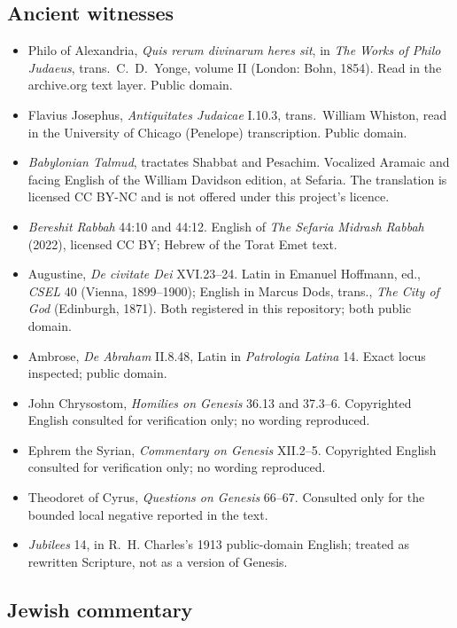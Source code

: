 \subsection{Ancient witnesses}

\begin{itemize}[leftmargin=1.2em,itemsep=0.2em,topsep=0.3em]
\item Philo of Alexandria, \textit{Quis rerum divinarum heres sit}, in
\textit{The Works of Philo Judaeus}, trans.\ C.~D.~Yonge, volume II (London:
Bohn, 1854). Read in the archive.org text layer. Public domain.
\item Flavius Josephus, \textit{Antiquitates Judaicae} I.10.3, trans.\ William
Whiston, read in the University of Chicago (Penelope) transcription. Public
domain.
\item \textit{Babylonian Talmud}, tractates Shabbat and Pesachim. Vocalized
Aramaic and facing English of the William Davidson edition, at Sefaria. The
translation is licensed CC BY-NC and is not offered under this project's licence.
\item \textit{Bereshit Rabbah} 44:10 and 44:12. English of \textit{The Sefaria
Midrash Rabbah} (2022), licensed CC BY; Hebrew of the Torat Emet text.
\item Augustine, \textit{De civitate Dei} XVI.23--24. Latin in Emanuel Hoffmann,
ed., \textit{CSEL} 40 (Vienna, 1899--1900); English in Marcus Dods, trans.,
\textit{The City of God} (Edinburgh, 1871). Both registered in this repository;
both public domain.
\item Ambrose, \textit{De Abraham} II.8.48, Latin in \textit{Patrologia
Latina} 14. Exact locus inspected; public domain.
\item John Chrysostom, \textit{Homilies on Genesis} 36.13 and 37.3--6.
Copyrighted English consulted for verification only; no wording reproduced.
\item Ephrem the Syrian, \textit{Commentary on Genesis} XII.2--5.
Copyrighted English consulted for verification only; no wording reproduced.
\item Theodoret of Cyrus, \textit{Questions on Genesis} 66--67. Consulted only
for the bounded local negative reported in the text.
\item \textit{Jubilees} 14, in R.~H. Charles's 1913 public-domain English;
treated as rewritten Scripture, not as a version of Genesis.
\end{itemize}

\subsection{Jewish commentary}

